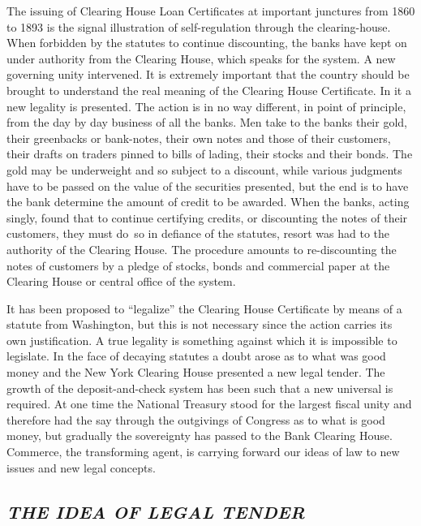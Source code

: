 \documentclass[openany,nobib]{tufte-book}
\begin{document}
The issuing of Clearing House Loan Certificates at important junctures
from 1860 to 1893 is the signal illustration of self-regulation through
the clearing-house. When forbidden by the statutes to continue
discounting, the banks have kept on under authority from the Clearing
House, which speaks for the system. A new governing unity intervened. It
is extremely important that the country should be brought to understand
the real meaning of the Clearing House Certificate. In it a new legality
is presented. The action is in no way different, in point of principle,
from the day by day business of all the banks. Men take to the banks
their gold, their greenbacks or bank-notes, their own notes and those of
their customers, their drafts on traders pinned to bills of lading,
their stocks and their bonds. The gold may be underweight and so subject
to a discount, while various judgments have to be passed on the value of
the securities presented, but the end is to have the bank determine the
amount of credit to be awarded. When the banks, acting singly, found
that to continue certifying credits, or discounting the notes of their
customers, they must do~so in defiance of the statutes, resort was had
to the authority of the Clearing House. The procedure amounts to
re-discounting the notes of customers by a pledge of stocks, bonds and
commercial paper at the Clearing House or central office of the system.~

It has been proposed to ``legalize'' the Clearing House Certificate by
means of a statute from Washington, but this is not necessary since the
action carries its own justification. A true legality is something
against which it is impossible to legislate. In the face of decaying
statutes a doubt arose as to what was good money and the New York
Clearing House presented a new legal tender. The growth of the
deposit-and-check system has been such that a new universal is required.
At one time the National Treasury stood for the largest fiscal unity and
therefore had the say through the outgivings of Congress as to what is
good money, but gradually the sovereignty has passed to the Bank
Clearing House. Commerce, the transforming agent, is carrying forward
our ideas of law to new issues and new legal concepts.~~

\enlargethispage{\baselineskip}

\hypertarget{the-idea-of-legal-tender}{%
\subsection{\texorpdfstring{\emph{THE IDEA OF LEGAL
TENDER}}{THE IDEA OF LEGAL TENDER}}\label{the-idea-of-legal-tender}}
\end{document}
